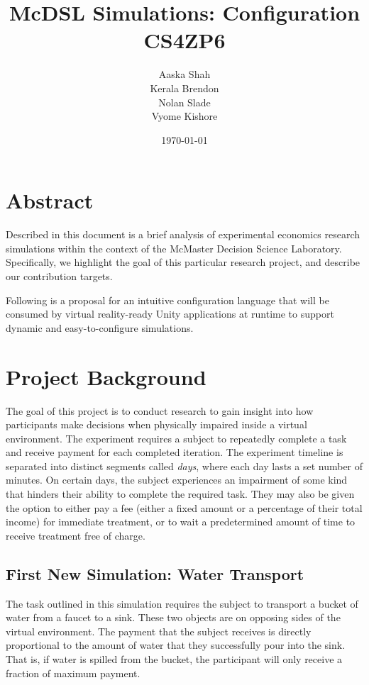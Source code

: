 \documentclass{article}
\title{\textbf{McDSL Simulations: Configuration}\\CS4ZP6}
\author{Aaska Shah\\Kerala Brendon\\Nolan Slade\\Vyome Kishore}
\date{\today}
\begin{document}
\maketitle

\section*{Abstract}

Described in this document is a brief analysis of experimental economics research simulations within the context of the McMaster Decision Science Laboratory. Specifically, we highlight the goal of this particular research project, and describe our contribution targets.

Following is a proposal for an intuitive configuration language that will be consumed by virtual reality-ready Unity applications at runtime to support dynamic and easy-to-configure simulations.

\section*{Project Background}
The goal of this project is to conduct research to gain insight into how participants make decisions when physically impaired inside a virtual environment. The experiment requires a subject to repeatedly complete a task and receive payment for each completed iteration. The experiment timeline is separated into distinct segments called \textit{days}, where each day lasts a set number of minutes. On certain days, the subject experiences an impairment of some kind that hinders their ability to complete the required task. They may also be given the option to either pay a fee (either a fixed amount or a percentage of their total income) for immediate treatment, or to wait a predetermined amount of time to receive treatment free of charge.

\subsection*{First New Simulation: Water Transport}

The task outlined in this simulation requires the subject to transport a bucket of water from a faucet to a sink. These two objects are on opposing sides of the virtual environment. The payment that the subject receives is directly proportional to the amount of water that they successfully pour into the sink. That is, if water is spilled from the bucket, the participant will only receive a fraction of maximum payment.
\end{document}
